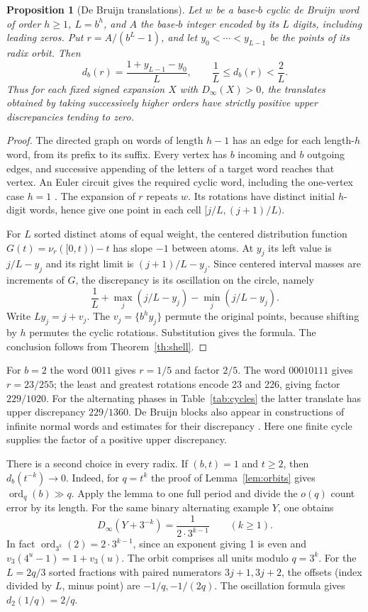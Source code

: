 \documentclass[11pt]{article}
\newtheorem{proposition}[theorem]{Proposition}
\newcommand{\ord}{\operatorname{ord}}
\newcommand{\fr}[1]{\{#1\}}
\begin{document}
\begin{proposition}[De Bruijn translations]\label{th:bruijn}
Let \(w\) be a base-\(b\) cyclic de Bruijn word of order \(h\ge1\), \(L=b^h\), and \(A\) the base-\(b\) integer encoded by its \(L\) digits, including leading zeros. Put \(r=A/(b^L-1)\), and let \(y_0<\cdots<y_{L-1}\) be the points of its radix orbit. Then
\[
 d_b(r)=\frac{1+y_{L-1}-y_0}{L},\qquad
 \frac1L\le d_b(r)<\frac2L .
\]
Thus for each fixed signed expansion \(X\) with \(D_\infty(X)>0\), the translates obtained by taking successively higher orders have strictly positive upper discrepancies tending to zero.
\end{proposition}
\begin{proof}
The directed graph on words of length \(h-1\) has an edge for each length-\(h\) word, from its prefix to its suffix. Every vertex has \(b\) incoming and \(b\) outgoing edges, and successive appending of the letters of a target word reaches that vertex. An Euler circuit gives the required cyclic word, including the one-vertex case \(h=1\) \cite{debruijn,good}. The expansion of \(r\) repeats \(w\). Its rotations have distinct initial \(h\)-digit words, hence give one point in each cell \([j/L,(j+1)/L)\).

For \(L\) sorted distinct atoms of equal weight, the centered distribution function \(G(t)=\nu_r([0,t))-t\) has slope \(-1\) between atoms. At \(y_j\) its left value is \(j/L-y_j\) and its right limit is \((j+1)/L-y_j\). Since centered interval masses are increments of \(G\), the discrepancy is its oscillation on the circle, namely
\[
 \frac1L+\max_j(j/L-y_j)-\min_j(j/L-y_j).
\]
Write \(Ly_j=j+v_j\). The \(v_j=\fr{b^hy_j}\) permute the original points, because shifting by \(h\) permutes the cyclic rotations. Substitution gives the formula. The conclusion follows from Theorem~\ref{th:shell}.
\end{proof}

For \(b=2\) the word \(0011\) gives \(r=1/5\) and factor \(2/5\). The word \(00010111\) gives \(r=23/255\); the least and greatest rotations encode 23 and 226, giving factor \(229/1020\). For the alternating phases in Table~\ref{tab:cycles} the latter translate has upper discrepancy \(229/1360\). De Bruijn blocks also appear in constructions of infinite normal words and estimates for their discrepancy \cite{bcarton}. Here one finite cycle supplies the factor of a positive upper discrepancy.

There is a second choice in every radix. If \((b,t)=1\) and \(t\ge2\), then \(d_b(t^{-k})\to0\). Indeed, for \(q=t^k\) the proof of Lemma~\ref{lem:orbits} gives \(\ord_q(b)\gg q\). Apply the lemma to one full period and divide the \(o(q)\) count error by its length. For the same binary alternating example \(Y\), one obtains
\[
 D_\infty(Y+3^{-k})=\frac{1}{2\cdot3^{k-1}}\qquad(k\ge1).
\]
In fact \(\ord_{3^k}(2)=2\cdot3^{k-1}\), since an exponent giving 1 is even and \(v_3(4^u-1)=1+v_3(u)\). The orbit comprises all units modulo \(q=3^k\). For the \(L=2q/3\) sorted fractions with paired numerators \(3j+1,3j+2\), the offsets (index divided by \(L\), minus point) are \(-1/q,-1/(2q)\). The oscillation formula gives \(d_2(1/q)=2/q\).
\end{document}
